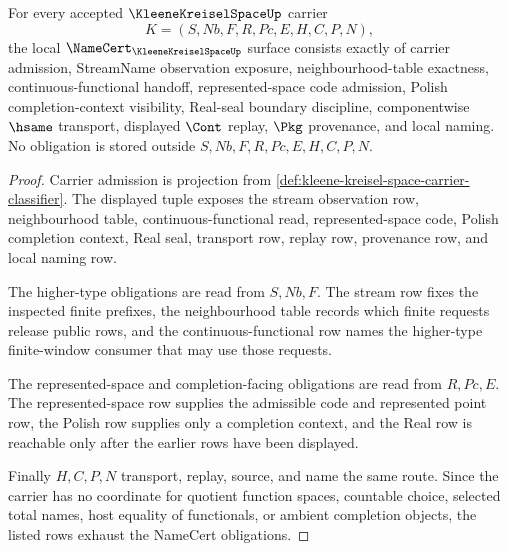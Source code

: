 \begin{theorem}
\label{thm:kleene-kreisel-space-namecert-obligations}
For every accepted $\KleeneKreiselSpaceUp$ carrier
$$
K=(S,Nb,F,R,Pc,E,H,C,P,N),
$$
the local $\NameCert_{\KleeneKreiselSpaceUp}$ surface consists exactly of carrier admission, StreamName observation exposure, neighbourhood-table exactness, continuous-functional handoff, represented-space code admission, Polish completion-context visibility, Real-seal boundary discipline, componentwise $\hsame$ transport, displayed $\Cont$ replay, $\Pkg$ provenance, and local naming. No obligation is stored outside $S,Nb,F,R,Pc,E,H,C,P,N$.
\end{theorem}
\begin{proof}
Carrier admission is projection from \autoref{def:kleene-kreisel-space-carrier-classifier}. The displayed tuple exposes the stream observation row, neighbourhood table, continuous-functional read, represented-space code, Polish completion context, Real seal, transport row, replay row, provenance row, and local naming row.

The higher-type obligations are read from $S,Nb,F$. The stream row fixes the inspected finite prefixes, the neighbourhood table records which finite requests release public rows, and the continuous-functional row names the higher-type finite-window consumer that may use those requests.

The represented-space and completion-facing obligations are read from $R,Pc,E$. The represented-space row supplies the admissible code and represented point row, the Polish row supplies only a completion context, and the Real row is reachable only after the earlier rows have been displayed.

Finally $H,C,P,N$ transport, replay, source, and name the same route. Since the carrier has no coordinate for quotient function spaces, countable choice, selected total names, host equality of functionals, or ambient completion objects, the listed rows exhaust the NameCert obligations.
\end{proof}

